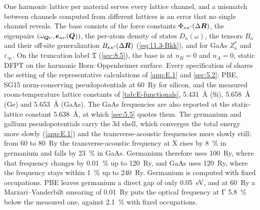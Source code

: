 One harmonic lattice per material serves every lattice channel, and a mismatch between channels computed from different lattices is an error that no single channel reveals. The base consists of the force constants $\Phi_{\kappa\kappa'}(\Delta\bm{R})$, the eigenpairs $(\omega_{\bm{Q}\nu},\bm{e}_{\kappa\nu}(\bm{Q}))$, the per-atom density of states $D_\kappa(\omega)$, the tensors $B_\kappa$ and their off-site generalization $B_{\kappa\kappa'}(\Delta\bm{R})$ (\cref{eq:11.3-Bkk}), and for GaAs $Z^*_\kappa$ and $\varepsilon_\infty$. On the truncation label $\mathfrak{T}$ (\cref{sec:8.5}), the base is at $n_B = 0$ and $n_A = 0$, static DFPT on the harmonic Born--Oppenheimer surface. Every specification of  shares the setting of the representative calculations of \cref{app:E.1} and \cref{sec:5.2}: PBE, SG15 norm-conserving pseudopotentials at \SI{60}{Ry} for silicon, and the measured room-temperature lattice constants of \cref{tab:E-functionals}, \SI{5.431}{\angstrom} (Si), \SI{5.658}{\angstrom} (Ge) and \SI{5.653}{\angstrom} (GaAs). The GaAs frequencies are also reported at the static-lattice constant \SI{5.638}{\angstrom}, at which \cref{sec:5.5} quotes them. The germanium and gallium pseudopotentials carry the 3d shell, which converges the total energy more slowly (\cref{app:E.1}) and the transverse-acoustic frequencies more slowly still: from 60 to \SI{80}{Ry} the transverse-acoustic frequency at X rises by \SI{8}{\percent} in germanium and falls by \SI{23}{\percent} in GaAs. Germanium therefore uses \SI{100}{Ry}, where that frequency changes by \SI{0.01}{\percent} up to \SI{120}{Ry}, and GaAs uses \SI{120}{Ry}, where the frequency stays within \SI{1}{\percent} up to \SI{240}{Ry}. Germanium is computed with fixed occupations. PBE leaves germanium a direct gap of only \SI{0.05}{eV}, and at \SI{60}{Ry} a Marzari--Vanderbilt smearing of \SI{0.01}{Ry} puts the optical frequency at $\mathrm{\Gamma}$ \SI{5.8}{\percent} below the measured one, against \SI{2.1}{\percent} with fixed occupations.

